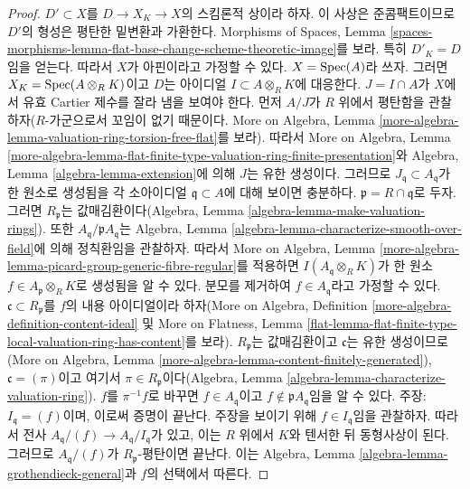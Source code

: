\begin{proof}
$D' \subset X$를 $D \to X_K \to X$의 스킴론적 상이라 하자. 이 사상은
준콤팩트이므로 $D'$의 형성은 평탄한 밑변환과 가환한다. Morphisms of Spaces,
Lemma
\ref{spaces-morphisms-lemma-flat-base-change-scheme-theoretic-image}를 보라.
특히 $D'_K = D$임을 얻는다. 따라서 $X$가 아핀이라고 가정할 수 있다.
$X = \mathop{\mathrm{Spec}}(A)$라 쓰자. 그러면 $X_K = \mathop{\mathrm{Spec}}(A \otimes_R K)$이고 $D$는
아이디얼 $I \subset A \otimes_R K$에 대응한다. $J = I \cap A$가 $X$에서
유효 Cartier 제수를 잘라 냄을 보여야 한다. 먼저 $A/J$가 $R$ 위에서
평탄함을 관찰하자($R$-가군으로서 꼬임이 없기 때문이다. More on Algebra,
Lemma \ref{more-algebra-lemma-valuation-ring-torsion-free-flat}를 보라).
따라서 More on Algebra, Lemma
\ref{more-algebra-lemma-flat-finite-type-valuation-ring-finite-presentation}와
Algebra, Lemma \ref{algebra-lemma-extension}에 의해 $J$는 유한 생성이다.
그러므로 $J_\mathfrak q \subset A_\mathfrak q$가 한 원소로 생성됨을 각
소아이디얼 $\mathfrak q \subset A$에 대해 보이면 충분하다.
$\mathfrak p = R \cap \mathfrak q$로 두자. 그러면 $R_\mathfrak p$는
값매김환이다(Algebra, Lemma
\ref{algebra-lemma-make-valuation-rings}). 또한
$A_\mathfrak q/\mathfrak p A_\mathfrak q$는 Algebra, Lemma
\ref{algebra-lemma-characterize-smooth-over-field}에 의해 정칙환임을
관찰하자. 따라서 More on Algebra, Lemma
\ref{more-algebra-lemma-picard-group-generic-fibre-regular}를 적용하면
$I(A_\mathfrak q \otimes_R K)$가 한 원소
$f \in A_\mathfrak p \otimes_R K$로 생성됨을 알 수 있다. 분모를 제거하여
$f \in A_\mathfrak q$라고 가정할 수 있다. $\mathfrak c \subset R_\mathfrak p$를
$f$의 내용 아이디얼이라 하자(More on Algebra, Definition
\ref{more-algebra-definition-content-ideal} 및 More on Flatness, Lemma
\ref{flat-lemma-flat-finite-type-local-valuation-ring-has-content}를 보라).
$R_\mathfrak p$는 값매김환이고 $\mathfrak c$는 유한 생성이므로(More on
Algebra, Lemma \ref{more-algebra-lemma-content-finitely-generated}),
$\mathfrak c = (\pi)$이고 여기서 $\pi \in R_\mathfrak p$이다(Algebra,
Lemma \ref{algebra-lemma-characterize-valuation-ring}).
$f$를 $\pi^{-1}f$로 바꾸면 $f \in A_\mathfrak q$이고
$f \not \in \mathfrak pA_\mathfrak q$임을 알 수 있다.
주장: $I_\mathfrak q = (f)$이며, 이로써 증명이 끝난다. 주장을 보이기 위해
$f \in I_\mathfrak q$임을 관찰하자. 따라서 전사
$A_\mathfrak q/(f) \to A_\mathfrak q/I_\mathfrak q$가 있고, 이는 $R$ 위에서
$K$와 텐서한 뒤 동형사상이 된다. 그러므로 $A_\mathfrak q/(f)$가
$R_\mathfrak p$-평탄이면 끝난다. 이는 Algebra, Lemma
\ref{algebra-lemma-grothendieck-general}과 $f$의 선택에서 따른다.
\end{proof}








